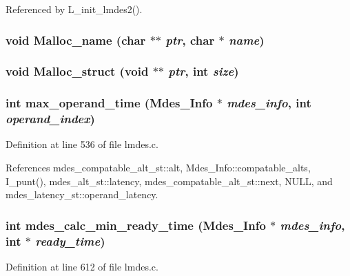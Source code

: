 Referenced by L\_\-init\_\-lmdes2().
\subsubsection{\setlength{\rightskip}{0pt plus 5cm}void Malloc\_\-name (char $\ast$$\ast$ {\em ptr}, char $\ast$ {\em name})}\label{lmdes_8h_94186a85a4489b80b7d305e6e13fec4c}


\subsubsection{\setlength{\rightskip}{0pt plus 5cm}void Malloc\_\-struct (void $\ast$$\ast$ {\em ptr}, int {\em size})}\label{lmdes_8h_44598a63bd3f29a90fdd27cb3531aff7}


\subsubsection{\setlength{\rightskip}{0pt plus 5cm}int max\_\-operand\_\-time (\bf{Mdes\_\-Info} $\ast$ {\em mdes\_\-info}, int {\em operand\_\-index})}\label{lmdes_8h_447043ce5a84413cb09ce4eb5ff1050c}




Definition at line 536 of file lmdes.c.

References mdes\_\-compatable\_\-alt\_\-st::alt, Mdes\_\-Info::compatable\_\-alts, I\_\-punt(), mdes\_\-alt\_\-st::latency, mdes\_\-compatable\_\-alt\_\-st::next, NULL, and mdes\_\-latency\_\-st::operand\_\-latency.
\subsubsection{\setlength{\rightskip}{0pt plus 5cm}int mdes\_\-calc\_\-min\_\-ready\_\-time (\bf{Mdes\_\-Info} $\ast$ {\em mdes\_\-info}, int $\ast$ {\em ready\_\-time})}\label{lmdes_8h_aa82b5ba2b71f304d335536fd6ee607f}




Definition at line 612 of file lmdes.c.

